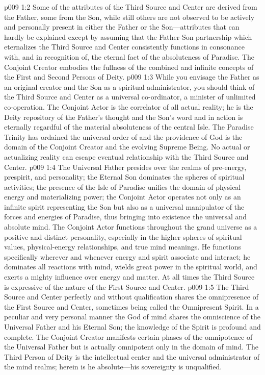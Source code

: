 \vs p009 1:2 Some of the attributes of the Third Source and Center are derived from the Father, some from the Son, while still others are not observed to be actively and personally present in either the Father or the Son---attributes that can hardly be explained except by assuming that the Father\hyp{}Son partnership which eternalizes the Third Source and Center consistently functions in consonance with, and in recognition of, the eternal fact of the absoluteness of Paradise. The Conjoint Creator embodies the fullness of the combined and infinite concepts of the First and Second Persons of Deity.
\pc \vs p009 1:3 While you envisage the Father as an original creator and the Son as a spiritual administrator, you should think of the Third Source and Center as a universal co\hyp{}ordinator, a minister of unlimited co\hyp{}operation. The Conjoint Actor is the correlator of all actual reality; he is the Deity repository of the Father’s thought and the Son’s word and in action is eternally regardful of the material absoluteness of the central Isle. The Paradise Trinity has ordained the universal order of  and the providence of God is the domain of the Conjoint Creator and the evolving Supreme Being. No actual or actualizing reality can escape eventual relationship with the Third Source and Center.
\pc \vs p009 1:4 The Universal Father presides over the realms of pre\hyp{}energy, prespirit, and personality; the Eternal Son dominates the spheres of spiritual activities; the presence of the Isle of Paradise unifies the domain of physical energy and materializing power; the Conjoint Actor operates not only as an infinite spirit representing the Son but also as a universal manipulator of the forces and energies of Paradise, thus bringing into existence the universal and absolute mind. The Conjoint Actor functions throughout the grand universe as a positive and distinct personality, especially in the higher spheres of spiritual values, physical\hyp{}energy relationships, and true mind meanings. He functions specifically wherever and whenever energy and spirit associate and interact; he dominates all reactions with mind, wields great power in the spiritual world, and exerts a mighty influence over energy and matter. At all times the Third Source is expressive of the nature of the First Source and Center.
\pc \vs p009 1:5 The Third Source and Center perfectly and without qualification shares the omnipresence of the First Source and Center, sometimes being called the Omnipresent Spirit. In a peculiar and very personal manner the God of mind shares the omniscience of the Universal Father and his Eternal Son; the knowledge of the Spirit is profound and complete. The Conjoint Creator manifests certain phases of the omnipotence of the Universal Father but is actually omnipotent only in the domain of mind. The Third Person of Deity is the intellectual center and the universal administrator of the mind realms; herein is he absolute---his sovereignty is unqualified.
